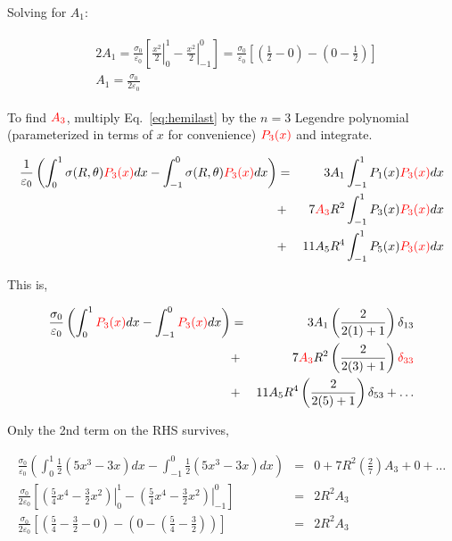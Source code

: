 \documentclass[12pt]{article}
\begin{document}
\begin{flushleft}
Solving for $A_{1}$:

\begin{eqnarray*}
\begin{aligned}
 & 2A_{1}  = \frac{\sigma_{0}}{\varepsilon_{0}} \left[ \left. \frac{x^{2}}{2}\right|_{0}^{1} - \left. \frac{x^{2}}{2}\right|_{-1}^{0}\right] = \frac{\sigma_{0}}{\varepsilon_{0}}  \left[ \left( \frac{1}{2} -0 \right) - \left( 0-\frac{1}{2} \right) \right] \\[6pt]
 &  A_{1}  =  \frac{\sigma_{0}}{2\varepsilon_{0}} 
\end{aligned}
\end{eqnarray*}

To find $\textcolor{red} {A_{3}}$, multiply Eq.~\ref{eq:hemilast} by the $n=3$ Legendre polynomial (parameterized in terms of $x$ for convenience) $\textcolor{red} {P_{3}(x)}$ and integrate.

\begin{eqnarray*}
\frac{1}{\varepsilon_{0}}\left( \int_{0}^{1} \sigma(R,\theta)\textcolor{red} {P_{3}(x)} dx -  \int_{-1}^{0} \sigma(R,\theta) \textcolor{red} {P_{3}(x)} dx \right) & = & 3A_{1} \int_{-1}^{1} P_{1}(x) \textcolor{red}{P_{3}(x)} dx \\
& + & 7\textcolor{red} {A_{3}} R^{2} \int_{-1}^{1} P_{3}(x) \textcolor{red}{P_{3}(x)} dx \\
& + & 11A_{5} R^{4} \int_{-1}^{1} P_{5}(x) \textcolor{red}{P_{3}(x)} dx 
\end{eqnarray*}

This is,

\begin{eqnarray*}
\frac{\sigma_{0}}{\varepsilon_{0}} \left( \int_{0}^{1} \textcolor{red} {P_{3}(x)} dx - \int_{-1}^{0} \textcolor{red} {P_{3}(x)} dx \right) & =  & 3 A_{1} \left( \frac{2}{2(1)+1} \right) \delta_{13}\\
& + & 7\textcolor{red} {A_{3}} R^{2}   \left( \frac{2}{2(3)+1} \right) \textcolor{red} {\delta_{33}}\\
& + & 11A_{5} R^{4} \left( \frac{2}{2(5)+1} \right) \delta_{53}   + \ldots
\end{eqnarray*}

Only the 2nd term on the RHS survives,

\begin{eqnarray*}
\frac{\sigma_{0}}{\varepsilon_{0}} \left( \int_{0}^{1}  \frac{1}{2}(5x^{3}-3x) dx - \int_{-1}^{0} \frac{1}{2}(5x^{3}-3x) dx \right) & = &  0 + 7R^{2}\left( \frac{2}{7} \right) A_{3} + 0 + \ldots  \\[4pt]
\frac{\sigma_{0}}{2\varepsilon_{0}}\left[ \left. \left( \frac{5}{4}x^{4}-\frac{3}{2}x^{2} \right) \right|_{0}^{1} -  \left. \left( \frac{5}{4}x^{4}-\frac{3}{2}x^{2} \right) \right|_{-1}^{0} \right] & = &  2R^{2} A_{3}   \\[4pt]
\frac{\sigma_{0}}{2\varepsilon_{0}}\left[ \left( \frac{5}{4}-\frac{3}{2} - 0 \right)  -  \left( 0 - \left( \frac{5}{4}-\frac{3}{2} \right) \right)  \right] & = &  2R^{2} A_{3} 
\end{eqnarray*}


\end{flushleft}
\end{document}
